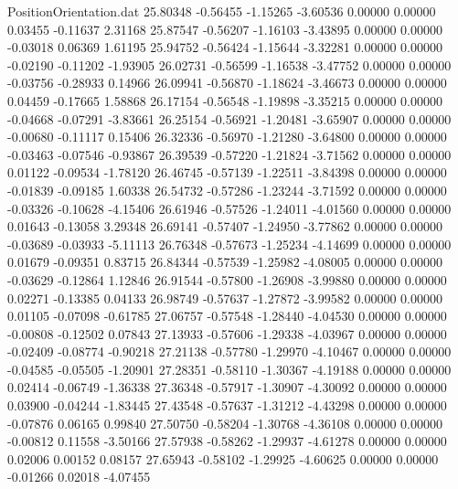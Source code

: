\begin{filecontents}{PositionOrientation.dat}
  25.80348   -0.56455   -1.15265    -3.60536    0.00000    0.00000    0.03455   -0.11637    2.31168
  25.87547   -0.56207   -1.16103    -3.43895    0.00000    0.00000   -0.03018    0.06369    1.61195
  25.94752   -0.56424   -1.15644    -3.32281    0.00000    0.00000   -0.02190   -0.11202   -1.93905
  26.02731   -0.56599   -1.16538    -3.47752    0.00000    0.00000   -0.03756   -0.28933    0.14966
  26.09941   -0.56870   -1.18624    -3.46673    0.00000    0.00000    0.04459   -0.17665    1.58868
  26.17154   -0.56548   -1.19898    -3.35215    0.00000    0.00000   -0.04668   -0.07291   -3.83661
  26.25154   -0.56921   -1.20481    -3.65907    0.00000    0.00000   -0.00680   -0.11117    0.15406
  26.32336   -0.56970   -1.21280    -3.64800    0.00000    0.00000   -0.03463   -0.07546   -0.93867
  26.39539   -0.57220   -1.21824    -3.71562    0.00000    0.00000    0.01122   -0.09534   -1.78120
  26.46745   -0.57139   -1.22511    -3.84398    0.00000    0.00000   -0.01839   -0.09185    1.60338
  26.54732   -0.57286   -1.23244    -3.71592    0.00000    0.00000   -0.03326   -0.10628   -4.15406
  26.61946   -0.57526   -1.24011    -4.01560    0.00000    0.00000    0.01643   -0.13058    3.29348
  26.69141   -0.57407   -1.24950    -3.77862    0.00000    0.00000   -0.03689   -0.03933   -5.11113
  26.76348   -0.57673   -1.25234    -4.14699    0.00000    0.00000    0.01679   -0.09351    0.83715
  26.84344   -0.57539   -1.25982    -4.08005    0.00000    0.00000   -0.03629   -0.12864    1.12846
  26.91544   -0.57800   -1.26908    -3.99880    0.00000    0.00000    0.02271   -0.13385    0.04133
  26.98749   -0.57637   -1.27872    -3.99582    0.00000    0.00000    0.01105   -0.07098   -0.61785
  27.06757   -0.57548   -1.28440    -4.04530    0.00000    0.00000   -0.00808   -0.12502    0.07843
  27.13933   -0.57606   -1.29338    -4.03967    0.00000    0.00000   -0.02409   -0.08774   -0.90218
  27.21138   -0.57780   -1.29970    -4.10467    0.00000    0.00000   -0.04585   -0.05505   -1.20901
  27.28351   -0.58110   -1.30367    -4.19188    0.00000    0.00000    0.02414   -0.06749   -1.36338
  27.36348   -0.57917   -1.30907    -4.30092    0.00000    0.00000    0.03900   -0.04244   -1.83445
  27.43548   -0.57637   -1.31212    -4.43298    0.00000    0.00000   -0.07876    0.06165    0.99840
  27.50750   -0.58204   -1.30768    -4.36108    0.00000    0.00000   -0.00812    0.11558   -3.50166
  27.57938   -0.58262   -1.29937    -4.61278    0.00000    0.00000    0.02006    0.00152    0.08157
  27.65943   -0.58102   -1.29925    -4.60625    0.00000    0.00000   -0.01266    0.02018   -4.07455

\end{filecontents}
